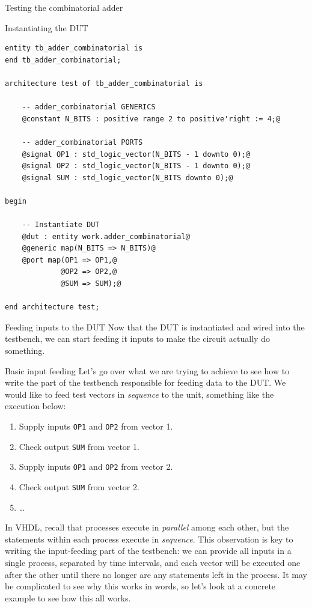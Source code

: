 \documentclass[lab]{course}
\begin{document}
\begin{section}{Testing the combinatorial adder}
\begin{subsection}{Instantiating the DUT}
\begin{lstlisting}[caption={Instantiate DUT}, label={lst:combinatorial_instantiate_dut}]
entity tb_adder_combinatorial is
end tb_adder_combinatorial;

architecture test of tb_adder_combinatorial is

    -- adder_combinatorial GENERICS
    @constant N_BITS : positive range 2 to positive'right := 4;@

    -- adder_combinatorial PORTS
    @signal OP1 : std_logic_vector(N_BITS - 1 downto 0);@
    @signal OP2 : std_logic_vector(N_BITS - 1 downto 0);@
    @signal SUM : std_logic_vector(N_BITS downto 0);@

begin

    -- Instantiate DUT
    @dut : entity work.adder_combinatorial@
    @generic map(N_BITS => N_BITS)@
    @port map(OP1 => OP1,@
             @OP2 => OP2,@
             @SUM => SUM);@

end architecture test;
        \end{lstlisting}
    \end{subsection}

    \clearpage

    \begin{subsection}{Feeding inputs to the DUT}
        Now that the DUT is instantiated and wired into the testbench, we can start feeding it inputs to make the circuit actually do something.

        \begin{subsubsection}{Basic input feeding}
            \label{sec:combinatorial_basic_input_feeding}
            Let's go over what we are trying to achieve to see how to write the part of the testbench responsible for feeding data to the DUT. We would like to feed test vectors in \emph{sequence} to the unit, something like the execution below:

            \begin{enumerate}
                \item Supply inputs \verb+OP1+ and \verb+OP2+ from vector 1.
                \item Check output \verb+SUM+ from vector 1.
                \item Supply inputs \verb+OP1+ and \verb+OP2+ from vector 2.
                \item Check output \verb+SUM+ from vector 2.
                \item \ldots
            \end{enumerate}

            In VHDL, recall that processes execute in \emph{parallel} among each other, but the statements within each process execute in \emph{sequence}. This observation is key to writing the input-feeding part of the testbench: we can provide all inputs in a single process, separated by time intervals, and each vector will be executed one after the other until there no longer are any statements left in the process. It may be complicated to see why this works in words, so let's look at a concrete example to see how this all works.


\end{subsubsection}
\end{subsection}
\end{section}
\end{document}

